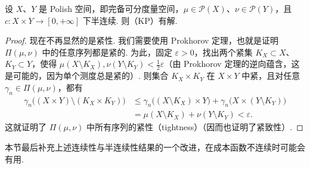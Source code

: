 \begin{theorem}\label{obj:1.7}
设 $X$、$Y$ 是 Polish 空间，即完备可分度量空间，$\mu\in\mathscr P(X)$、$\nu\in\mathscr P(Y)$，且 $c:X\times Y\to[0,+\infty]$ 下半连续. 则（KP）有解.
\end{theorem}
\begin{proof}
现在不再显然的是紧性. 我们需要使用 Prokhorov 定理，也就是证明 $\Pi(\mu,\nu)$ 中的任意序列都是紧的. 为此，固定 $\varepsilon>0$，找出两个紧集 $K_X\subset X$、$K_Y\subset Y$，使得 $\mu(X\setminus K_X),\nu(Y\setminus K_Y)<\frac12\varepsilon$（由 Prokhorov 定理的逆向蕴含，这是可能的，因为单个测度总是紧的）. 则集合 $K_X\times K_Y$ 在 $X\times Y$ 中紧，且对任意 $\gamma_n\in\Pi(\mu,\nu)$，都有
\begin{equation*}
\begin{aligned}
\gamma_n\bigl((X\times Y)\setminus(K_X\times K_Y)\bigr)
&\le\gamma_n\bigl((X\setminus K_X)\times Y\bigr)+\gamma_n\bigl(X\times(Y\setminus K_Y)\bigr)\\
&=\mu(X\setminus K_X)+\nu(Y\setminus K_Y)<\varepsilon.
\end{aligned}
\end{equation*}
这就证明了 $\Pi(\mu,\nu)$ 中所有序列的紧性（tightness）（因而也证明了紧致性）.
\end{proof}

本节最后补充上述连续性与半连续性结果的一个改进，在成本函数不连续时可能会有用.

